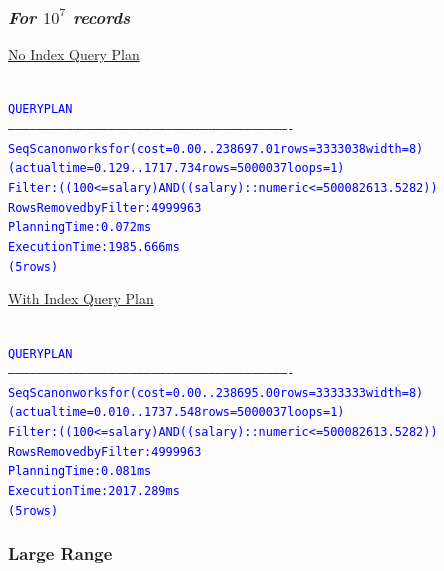 \documentclass{article}
\begin{document}
    \subsubsection*{\emph{For $10^7$ records}}
    \underline{No Index Query Plan}
    \begin{center}
      {\tiny
      \begin{alltt}
      \textcolor{blue}{
        QUERY PLAN                                                      
        ----------------------------------------------------------------------------------------------------------------------
         Seq Scan on worksfor  (cost=0.00..238697.01 rows=3333038 width=8) (actual time=0.129..1717.734 rows=5000037 loops=1)
           Filter: ((100 <= salary) AND ((salary)::numeric <= 500082613.5282))
           Rows Removed by Filter: 4999963
         Planning Time: 0.072 ms
         Execution Time: 1985.666 ms
        (5 rows)
       }
      \end{alltt}
      }
    \end{center}
    \underline{With Index Query Plan}
    \begin{center}
      {\tiny
      \begin{alltt}
      \textcolor{blue}{
        QUERY PLAN                                                      
        ----------------------------------------------------------------------------------------------------------------------
         Seq Scan on worksfor  (cost=0.00..238695.00 rows=3333333 width=8) (actual time=0.010..1737.548 rows=5000037 loops=1)
           Filter: ((100 <= salary) AND ((salary)::numeric <= 500082613.5282))
           Rows Removed by Filter: 4999963
         Planning Time: 0.081 ms
         Execution Time: 2017.289 ms
        (5 rows)
       }
      \end{alltt}
      }
    \end{center}


    \subsubsection*{Large Range}
\end{document}
